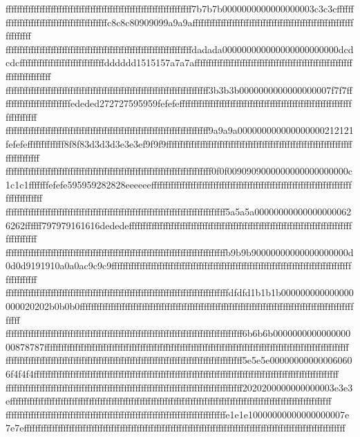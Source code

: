 {{{ffffffffffffffffffffffffffffffffffffffffffffffffffffffffffffffffff7b7b7b0000000000000000003c3c3cffffffffffffffffffffffffffffffffffffffffffc8c8c80909099a9a9affffffffffffffffffffffffffffffffffffffffffffffffffffffffffffffffff
ffffffffffffffffffffffffffffffffffffffffffffffffffffffffffffffffffdadada000000000000000000000000dcdcdcffffffffffffffffffffffffffffffdddddd1515157a7a7affffffffffffffffffffffffffffffffffffffffffffffffffffffffffffffffffffffff
ffffffffffffffffffffffffffffffffffffffffffffffffffffffffffffffffffffffff3b3b3b0000000000000000007f7f7fffffffffffffffffffffffffededed272727595959fefefeffffffffffffffffffffffffffffffffffffffffffffffffffffffffffffffffffffffff
ffffffffffffffffffffffffffffffffffffffffffffffffffffffffffffffffffffffff9a9a9a000000000000000000212121fefefefffffffffffff8f8f83d3d3d3e3e3ef9f9f9ffffffffffffffffffffffffffffffffffffffffffffffffffffffffffffffffffffffffffffff
fffffffffffffffffffffffffffffffffffffffffffffffffffffffffffffffffffffffff0f0f0090909000000000000000000c1c1c1fffffffefefe595959282828eeeeeeffffffffffffffffffffffffffffffffffffffffffffffffffffffffffffffffffffffffffffffffffff
ffffffffffffffffffffffffffffffffffffffffffffffffffffffffffffffffffffffffffffff5a5a5a000000000000000000626262ffffff797979161616dededeffffffffffffffffffffffffffffffffffffffffffffffffffffffffffffffffffffffffffffffffffffffffff
ffffffffffffffffffffffffffffffffffffffffffffffffffffffffffffffffffffffffffffffb9b9b90000000000000000000d0d0d9191910a0a0ac9c9c9ffffffffffffffffffffffffffffffffffffffffffffffffffffffffffffffffffffffffffffffffffffffffffffffff
fffffffffffffffffffffffffffffffffffffffffffffffffffffffffffffffffffffffffffffffdfdfd1b1b1b000000000000000000020202b0b0b0ffffffffffffffffffffffffffffffffffffffffffffffffffffffffffffffffffffffffffffffffffffffffffffffffffffff
ffffffffffffffffffffffffffffffffffffffffffffffffffffffffffffffffffffffffffffffffffff6b6b6b000000000000000000878787ffffffffffffffffffffffffffffffffffffffffffffffffffffffffffffffffffffffffffffffffffffffffffffffffffffffffffff
ffffffffffffffffffffffffffffffffffffffffffffffffffffffffffffffffffffffffffffffffffff5e5e5e000000000000060606f4f4f4ffffffffffffffffffffffffffffffffffffffffffffffffffffffffffffffffffffffffffffffffffffffffffffffffffffffffffff
ffffffffffffffffffffffffffffffffffffffffffffffffffffffffffffffffffffffffffffffffffff2020200000000000003e3e3effffffffffffffffffffffffffffffffffffffffffffffffffffffffffffffffffffffffffffffffffffffffffffffffffffffffffffffffff
ffffffffffffffffffffffffffffffffffffffffffffffffffffffffffffffffffffffffffffffe1e1e10000000000000000007e7e7effffffffffffffffffffffffffffffffffffffffffffffffffffffffffffffffffffffffffffffffffffffffffffffffffffffffffffffffff
}}}
